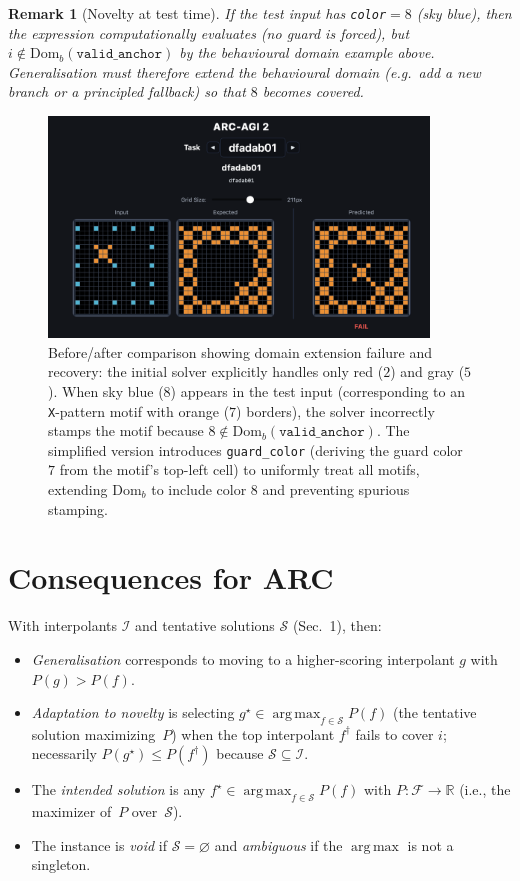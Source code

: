 \documentclass[11pt]{article}
\newtheorem{remark}{Remark}
\newcommand{\F}{\mathcal{F}}
\newcommand{\Domb}{\mathrm{Dom}_b}
\DeclareMathOperator*{\argmax}{arg\,max}
\begin{document}
\begin{remark}[Novelty at test time]
If the test input has \texttt{color}$=8$ (sky blue), then the expression \emph{computationally} evaluates (no guard is forced), but $i\notin\Domb(\texttt{valid\_anchor})$ by the behavioural domain example above. Generalisation must therefore extend the behavioural domain (e.g.\ add a new branch or a principled fallback) so that $8$ becomes covered.
\end{remark}

\begin{figure}[ht]
\centering
\includegraphics[width=0.9\textwidth]{images/solver_comparison.png}
\caption{Before/after comparison showing domain extension failure and recovery: the initial solver explicitly handles only red ($2$) and gray ($5$). When sky blue ($8$) appears in the test input (corresponding to an \texttt{X}-pattern motif with orange ($7$) borders), the solver incorrectly stamps the motif because $8 \notin \Domb(\texttt{valid\_anchor})$. The simplified version introduces \texttt{guard\_color} (deriving the guard color $7$ from the motif's top-left cell) to uniformly treat all motifs, extending $\Domb$ to include color $8$ and preventing spurious stamping.}
\label{fig:comparison}
\end{figure}

\section{Consequences for ARC}

With interpolants $\mathcal{I}$ and tentative solutions $\mathcal{S}$ (Sec.~1), then:
\begin{itemize}[leftmargin=1.5em]
\item \emph{Generalisation} corresponds to moving to a higher-scoring interpolant $g$ with $P(g)>P(f)$.
\item \emph{Adaptation to novelty} is selecting $g^\star\in\argmax_{f\in\mathcal{S}}P(f)$ (the tentative solution maximizing~$P$) when the top interpolant $f^\dagger$ fails to cover $i$; necessarily $P(g^\star)\le P(f^\dagger)$ because $\mathcal{S}\subseteq\mathcal{I}$.
\item The \emph{intended solution} is any $f^\star\in\argmax_{f\in\mathcal{S}}P(f)$ with $P:\F\to\mathbb{R}$ (i.e., the maximizer of~$P$ over~$\mathcal{S}$).
\item The instance is \emph{void} if $\mathcal{S}=\varnothing$ and \emph{ambiguous} if the $\argmax$ is not a singleton.
\end{itemize}
\end{document}
